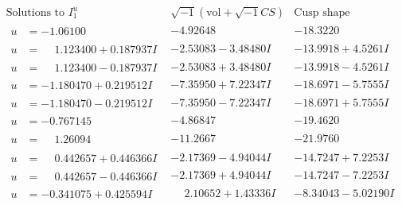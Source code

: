 \documentclass[1p]{elsarticle_modified}
\theoremstyle{definition}
\newcommand{\I}{\sqrt{-1}}
\begin{document}
$$\begin{array}{c|c|c}  
\text{Solutions to }I^u_{1}& \I (\text{vol} + \sqrt{-1}CS) & \text{Cusp shape}\\
 \hline 
\begin{aligned}
u &= -1.06100\phantom{ +0.000000I}\end{aligned}
 & -4.92648\phantom{ +0.000000I} & -18.3220\phantom{ +0.000000I} \\ \hline\begin{aligned}
u &= \phantom{-}1.123400 + 0.187937 I\end{aligned}
 & -2.53083 - 3.48480 I & -13.9918 + 4.5261 I \\ \hline\begin{aligned}
u &= \phantom{-}1.123400 - 0.187937 I\end{aligned}
 & -2.53083 + 3.48480 I & -13.9918 - 4.5261 I \\ \hline\begin{aligned}
u &= -1.180470 + 0.219512 I\end{aligned}
 & -7.35950 + 7.22347 I & -18.6971 - 5.7555 I \\ \hline\begin{aligned}
u &= -1.180470 - 0.219512 I\end{aligned}
 & -7.35950 - 7.22347 I & -18.6971 + 5.7555 I \\ \hline\begin{aligned}
u &= -0.767145\phantom{ +0.000000I}\end{aligned}
 & -4.86847\phantom{ +0.000000I} & -19.4620\phantom{ +0.000000I} \\ \hline\begin{aligned}
u &= \phantom{-}1.26094\phantom{ +0.000000I}\end{aligned}
 & -11.2667\phantom{ +0.000000I} & -21.9760\phantom{ +0.000000I} \\ \hline\begin{aligned}
u &= \phantom{-}0.442657 + 0.446366 I\end{aligned}
 & -2.17369 - 4.94044 I & -14.7247 + 7.2253 I \\ \hline\begin{aligned}
u &= \phantom{-}0.442657 - 0.446366 I\end{aligned}
 & -2.17369 + 4.94044 I & -14.7247 - 7.2253 I \\ \hline\begin{aligned}
u &= -0.341075 + 0.425594 I\end{aligned}
 & \phantom{-}2.10652 + 1.43336 I & -8.34043 - 5.02190 I \\ \hline\begin{aligned}

\end{aligned}
\end{array}$$
\end{document}
